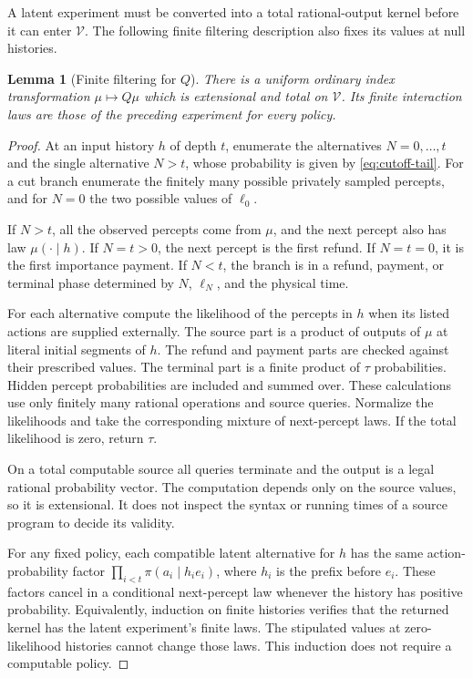 \documentclass[11pt]{article}
\newtheorem{lemma}[theorem]{Lemma}
\theoremstyle{definition}
\theoremstyle{remark}
\newcommand{\V}{\mathcal V}
\begin{document}
A latent experiment must be converted into a total rational-output
kernel before it can enter $\V$.  The following finite filtering
description also fixes its values at null histories.

\begin{lemma}[Finite filtering for $Q$]
\label{lem:q-computable}
There is a uniform ordinary index transformation $\mu\mapsto Q\mu$
which is extensional and total on $\V$.  Its finite interaction laws
are those of the preceding experiment for every policy.
\end{lemma}

\begin{proof}
At an input history $h$ of depth $t$, enumerate the alternatives
$N=0,\ldots,t$ and the single alternative $N>t$, whose probability is
given by \eqref{eq:cutoff-tail}.  For a cut branch enumerate the finitely
many possible privately sampled percepts, and for $N=0$ the two possible
values of $\ell_0$.

If $N>t$, all the observed percepts come from $\mu$, and the next
percept also has law $\mu(\cdot\mid h)$.  If $N=t>0$, the next
percept is the first refund.  If $N=t=0$, it is the first importance
payment.  If $N<t$, the branch is in a refund, payment, or terminal
phase determined by $N$, $\ell_N$, and the physical time.

For each alternative compute the likelihood of the percepts in $h$
when its listed actions are supplied externally.  The source part is
a product of outputs of $\mu$ at literal initial segments of $h$.
The refund and payment parts are checked against their prescribed
values.  The terminal part is a finite product of $\tau$ probabilities.
Hidden percept probabilities are included and summed over.  These
calculations use only finitely many rational operations and source
queries.  Normalize the likelihoods and take the corresponding mixture
of next-percept laws.  If the total likelihood is zero, return $\tau$.

On a total computable source all queries terminate and the output is a
legal rational probability vector.  The computation depends only on the
source values, so it is extensional.  It does not inspect the syntax or
running times of a source program to decide its validity.

For any fixed policy, each compatible latent alternative for $h$ has
the same action-probability factor
$\prod_{i<t}\pi(a_i\mid h_i e_i)$, where $h_i$ is the prefix before
$e_i$.  These factors cancel in a conditional next-percept law whenever
the history has positive probability.  Equivalently, induction on
finite histories verifies that the returned kernel has the latent
experiment's finite laws.  The stipulated values at zero-likelihood
histories cannot change those laws.  This induction does not require a
computable policy.
\end{proof}
\end{document}
